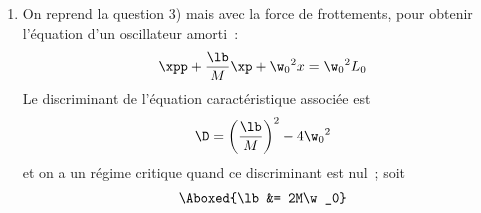 \documentclass[a4paper, 12pt, final, garamond]{book}
\begin{document}
\begin{enumerate}
        est maintenant égale à l'énergie absorbée par le dispositif de freinage,
        c'est-à-dire
        \[\D\Ec_m = \Ec_{m,f} - \Ec{m,i} = -\Ec_a\]
        puisque l'énergie cinétique doit décroître et que $\Ec_a$ est positive.
        Or, initialement et finalement,
        \[
            \Ec_{m,i} = \Ec_c = \frac{1}{2}Mv_c{}^2
            \qet
            \Ec_{m,f} = \Ec_p = \frac{1}{2}k_2d^2
        \]
        Soit
        \begin{align*}
            \frac{1}{2}k_2d^2 - \frac{1}{2}Mv_c{}^2 &= -\Ec_a
            \\\Lra
            k_2 &= \frac{1}{d^2}\left(Mv_c{}^2 -2\Ec_a\right)
            \\\Lra
            \Aboxed{k_2 &= \frac{1}{d^2}\left(\frac{m^2}{M}v_0{}^2
            -2\Ec_a\right)}
            \qed
            \qavec
            \left\{
                \begin{array}{rcl}
                    m     & = & \SI{2.0}{kg}\\
                    M     & = & \SI{800}{kg}\\
                    v_0   & = & \SI{600}{m.s^{-1}}\\
                    \Ec_a & = & \SI{778}{J}
                \end{array}
            \right.\\
            \AN
            \Aboxed{k_2 &= \SI{244}{N.m^{-1}}}\\
            \text{De plus, }
            \Aboxed{\w_0 &= \sqrt{\frac{k_2}{M}}}
            \qavec
            \left\{
                \begin{array}{rcl}
                    k_2 & = & \SI{244}{N.m^{-1}}\\
                    M   & = & \SI{800}{kg}
                \end{array}
            \right.\\
            \AN
            \Aboxed{\w_0 &= \SI{0.55}{rad.s^{-1}}}
        \end{align*}
    \item On reprend la question 3) mais avec la force de frottements, pour
        obtenir l'équation d'un oscillateur amorti~:
        \[\xpp + \frac{\lb}{M}\xp + \w_0{}^2x = \w_0{}^2L_0\]
        Le discriminant de l'équation caractéristique associée est
        \[\D = \left( \frac{\lb}{M} \right)^2 - 4\w_0{}^2\]
        et on a un régime critique quand ce discriminant est nul~; soit
        \begin{align*}
            \Aboxed{\lb &= 2M\w_0}

\end{align*}
\end{enumerate}
\end{document}
